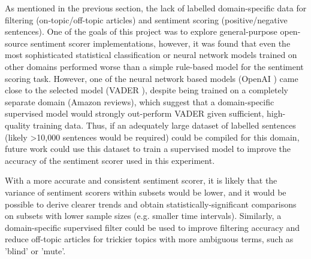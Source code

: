 \documentclass{report}
\begin{document}
As mentioned in the previous section, the lack of labelled domain-specific data for filtering (on-topic/off-topic articles) and sentiment scoring (positive/negative sentences).
One of the goals of this project was to explore general-purpose open-source sentiment scorer implementations, however, it was found that even the most sophisticated statistical classification or neural network models trained on other domains performed worse than a simple rule-based model for the sentiment scoring task.
However, one of the neural network based models (OpenAI \cite{OpenAI}) came close to the selected model (VADER \cite{VADER}), despite being trained on a completely separate domain (Amazon reviews), which suggest that a domain-specific supervised model would strongly out-perform VADER given sufficient, high-quality training data.
Thus, if an adequately large dataset of labelled sentences (likely \textgreater10,000 sentences would be required) could be compiled for this domain, future work could use this dataset to train a supervised model to improve the accuracy of the sentiment scorer used in this experiment.

With a more accurate and consistent sentiment scorer, it is likely that the variance of sentiment scorers within subsets would be lower, and it would be possible to derive clearer trends and obtain statistically-significant comparisons on subsets with lower sample sizes (e.g. smaller time intervals).
Similarly, a domain-specific supervised filter could be used to improve filtering accuracy and reduce off-topic articles for trickier topics with more ambiguous terms, such as 'blind' or 'mute'.
\end{document}

